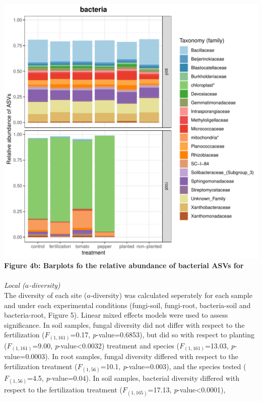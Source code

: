 \documentclass[11pt,]{article}
\begin{document}
\hspace*{0.333em} ~\\
\includegraphics[width=7.29167in]{../figures/Figure4_FAMILY_barplots_bacteria.pdf}\\
\textbf{Figure 4b: Barplots fo the relative abundance of bacterial ASVs
for }\\
\hspace*{0.333em} ~\\
\emph{Local (\(a\)-diversity)}\\
The diversity of each site (\(a\)-diversity) was calculated seperately
for each sample and under each experimental conditions (fungi-soil,
fungi-root, bacteria-soil and bacteria-root, Figure 5). Linear mixed
effects models were used to assess significance. In soil samples, fungal
diversity did not differ with respect to the fertilization
(\(F_{(1,161)}\)=0.17, \emph{p}-value=0.6853), but did so with respect
to planting (\(F_{(1,161)}\)=9.00, \emph{p}-value\textless{}0.0032)
treatment and species (\(F_{(1,161)}\)=13.03, \emph{p}-value=0.0003). In
root samples, fungal diversity differed with respect to the
fertilization treatment (\(F_{(1,56)}\)=10.1, \emph{p}-value=0.003), and
the species tested (\(F_{(1,56)}\)=4.5, \emph{p}-value=0.04). In soil
samples, bacterial diversity differed with respect to the fertilization
treatment (\(F_{(1,165)}\)=17.13, \emph{p}-value\textless{}0.0001),
\end{document}
